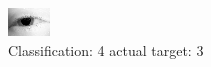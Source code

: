 \begin{figure}[h!]
\begin{center}
\includegraphics[width=0.60\columnwidth]{figures/ID163_class_4_target_3.png}
\end{center}
\caption{ Classification: 4 actual target: 3}
\label{fig:ID163_class_4_target_3}
\end{figure}

